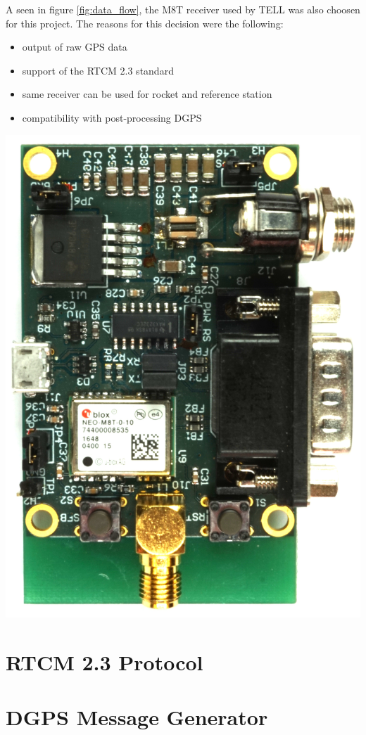 \begin{minipage}{0.6\textwidth}
  A seen in figure \ref{fig:data_flow}, the M8T receiver used by TELL was also choosen for this project.
  The reasons for this decision were the following:
  \begin{itemize}
  \item output of raw GPS data
  \item support of the RTCM 2.3 standard
  \item same receiver can be used for rocket and reference station
  \item compatibility with post-processing DGPS
  \end{itemize}
\end{minipage}
\hfill
\begin{minipage}{0.37\textwidth}
 \centering
 \includegraphics[width=\textwidth]{images/M8T_Receiver_Board.jpg}
 \label{fig:m8t_receiver_board}
\end{minipage}

\section{RTCM 2.3 Protocol}\label{sec:rtcm}

\section{DGPS Message Generator}\label{sec:dgps_message_generator}

